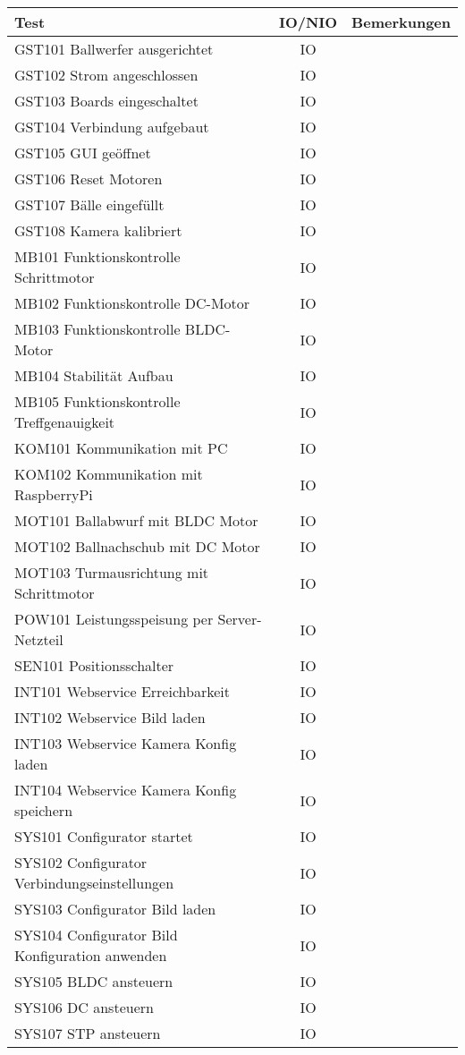 \begin{table}[h!]
	\centering
	\renewcommand{\arraystretch}{1.5}
	\begin{tabular}{|l|c|p{4cm}|}
		\hline \textbf{Test} & \textbf{IO/NIO} & \textbf{Bemerkungen} \\
		\hline GST101 Ballwerfer ausgerichtet & IO & \\
		\hline GST102 Strom angeschlossen & IO & \\
		\hline GST103 Boards eingeschaltet & IO & \\
		\hline GST104 Verbindung aufgebaut & IO & \\
		\hline GST105 GUI geöffnet & IO & \\
		\hline GST106 Reset Motoren & IO & \\
		\hline GST107 Bälle eingefüllt & IO & \\
		\hline GST108 Kamera kalibriert & IO & \\
		\hline MB101 Funktionskontrolle Schrittmotor & IO & \\
		\hline MB102 Funktionskontrolle DC-Motor & IO & \\
		\hline MB103 Funktionskontrolle BLDC-Motor & IO & \\
		\hline MB104 Stabilität Aufbau & IO & \\
		\hline MB105 Funktionskontrolle Treffgenauigkeit & IO & \\
		\hline KOM101 Kommunikation mit PC & IO & \\
		\hline KOM102 Kommunikation mit RaspberryPi & IO & \\
		\hline MOT101 Ballabwurf mit BLDC Motor & IO & \\
		\hline MOT102 Ballnachschub mit DC Motor & IO & \\
		\hline MOT103 Turmausrichtung mit Schrittmotor & IO & \\
		\hline POW101 Leistungsspeisung per Server-Netzteil & IO & \\
		\hline SEN101 Positionsschalter & IO & \\
		\hline INT101 Webservice Erreichbarkeit & IO & \\
		\hline INT102 Webservice Bild laden & IO & \\
		\hline INT103 Webservice Kamera Konfig laden & IO & \\
		\hline INT104 Webservice Kamera Konfig speichern & IO & \\
		\hline SYS101 Configurator startet & IO & \\
		\hline SYS102 Configurator Verbindungseinstellungen & IO & \\
		\hline SYS103 Configurator Bild laden & IO & \\
		\hline SYS104 Configurator Bild Konfiguration anwenden & IO & \\
		\hline SYS105 BLDC ansteuern & IO & \\
		\hline SYS106 DC ansteuern & IO & \\
		\hline SYS107 STP ansteuern & IO & \\
		\hline 
	\end{tabular}
\end{table}